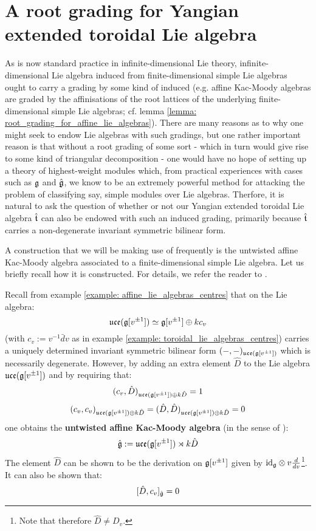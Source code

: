 \section{A root grading for Yangian extended toroidal Lie algebra} \label{section: root_grading_for_yangian_EALAs}
    As is now standard practice in infinite-dimensional Lie theory, infinite-dimensional Lie algebra induced from finite-dimensional simple Lie algebras ought to carry a grading by some kind of induced  (e.g. affine Kac-Moody algebras are graded by the affinisations of the root lattices of the underlying finite-dimensional simple Lie algebras; cf. lemma \ref{lemma: root_grading_for_affine_lie_algebras}). There are many reasons as to why one might seek to endow Lie algebras with such gradings, but one rather important reason is that without a root grading of some sort - which in turn would give rise to some kind of triangular decomposition - one would have no hope of setting up a theory of highest-weight modules which, from practical experiences with cases such as $\mathfrak{g}$ and $\hat{\mathfrak{g}}$, we know to be an extremely powerful method for attacking the problem of classifying say, simple modules over Lie algebras. Therfore, it is natural to ask the question of whether or not our Yangian extended toroidal Lie algebra $\hat{\mathfrak{t}}$ can also be endowed with such an induced grading, primarily because $\hat{\mathfrak{t}}$ carries a non-degenerate invariant symmetric bilinear form.

    A construction that we will be making use of frequently is the untwisted affine Kac-Moody algebra associated to a finite-dimensional simple Lie algebra. Let us briefly recall how it is constructed. For details, we refer the reader to \cite[Chapter 7]{kac_infinite_dimensional_lie_algebras}.

    Recall from example \ref{example: affine_lie_algebras_centres} that on the Lie algebra:
        $$\mathfrak{uce}(\mathfrak{g}[v^{\pm 1}]) \simeq \mathfrak{g}[v^{\pm 1}] \oplus k c_v$$
    (with $c_v := v^{-1} \bar{d}v$ as in example \ref{example: toroidal_lie_algebras_centres}) carries a uniquely determined invariant symmetric bilinear form $(-, -)_{\mathfrak{uce}(\mathfrak{g}[v^{\pm 1}])}$ which is necessarily degenerate. However, by adding an extra element $\hat{D}$ to the Lie algebra $\mathfrak{uce}(\mathfrak{g}[v^{\pm 1}])$ and by requiring that:
        $$(c_v, \hat{D})_{\mathfrak{uce}(\mathfrak{g}[v^{\pm 1}]) \oplus k \hat{D}} = 1$$
        $$(c_v, c_v)_{\mathfrak{uce}(\mathfrak{g}[v^{\pm 1}]) \oplus k \hat{D}} = (\hat{D}, \hat{D})_{\mathfrak{uce}(\mathfrak{g}[v^{\pm 1}]) \oplus k \hat{D}} = 0$$
    one obtains the \textbf{untwisted affine Kac-Moody algebra} (in the sense of \cite[Chapter 7]{kac_infinite_dimensional_lie_algebras}):
        $$\hat{\mathfrak{g}} := \mathfrak{uce}(\mathfrak{g}[v^{\pm 1}]) \rtimes k \hat{D}$$
    The element $\hat{D}$ can be shown to be the derivation on $\mathfrak{g}[v^{\pm 1}]$ given by $\id_{\g} \tensor v \frac{d}{dv}$\footnote{Note that therefore $\hat{D} \not = D_v$.}. It can also be shown that:
        $$[\hat{D}, c_v]_{\hat{\mathfrak{g}}} = 0$$

